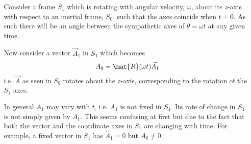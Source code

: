 Consider a frame $S_1$ which is rotating with angular velocity,
$\omega$, about its $z$-axis with respect to an inertial frame, $S_0$,
such that the axes coincide when $t=0$. As such there will be an angle
between the sympathetic axes of $\theta = \omega t$ at any given time.

Now consider a vector $\vec{A}_1$ in $S_1$ which becomes 
\[A_0 = \mat{R}(\omega t) \vec{A}_1 \] i.e. $\vec{A}$ as seen in $S_0$
rotates about the $z$-axis, corresponding to the rotation of the $S_1$
axes. 

In general $A_1$ may vary with $t$, i.e. $A_1$ is not fixed in
$S_1$. Its rate of change in $S_1$ is not simply given by $A_1$. This
seems confusing at first but due to the fact that both the vector and
the coordinate axes in $S_1$ are changing with time. For example, a
fixed vector in $S_1$ has $\dot{A}_1=0$ but $\dot{A}_0 \neq 0$.
